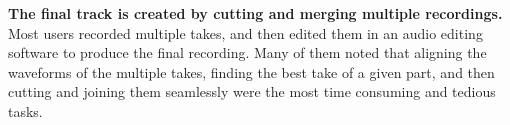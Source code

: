  





\textbf{The final track is created by cutting and merging multiple recordings.} Most users recorded multiple takes, and then edited them in an audio editing software to produce the final recording. Many of them noted that aligning the waveforms of the multiple takes, finding the best take of a given part, and then cutting and joining them seamlessly  were the most time consuming and tedious tasks.


